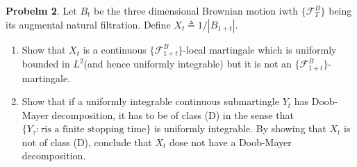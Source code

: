 \documentclass{article}     %
\begin{document}
\noindent
\textbf{Probelm 2}. Let $B_t$ be the three dimensional Brownian motion iwth $\{\mathcal{F}^B_T\}$ being its augmental natural filtration. Define $X_t \triangleq 1/|B_{1+t}|$.
\begin{enumerate}
    \item Show that $X_t$ is a continuous $\{\mathcal{F}^B_{1+t}\}$-local martingale which is uniformly bounded in $L^2$(and hence uniformly integrable) but it is not an $\{\mathcal{F}^B_{1+t}\}$-martingale.
    \item Show that if a uniformly integrable continuous submartingle $Y_t$ has Doob-Mayer decomposition, it has to be of class (D) in the sense that $\{Y_{\tau}:\tau \text{is a finite stopping time}\}$ is uniformly integrable. By showing that $X_t$ is not of class (D), conclude that $X_t$ dose not have a Doob-Mayer decomposition.
\end{enumerate}
\end{document}
